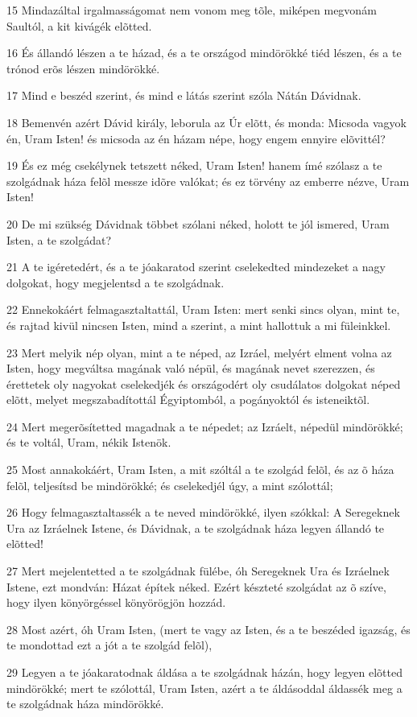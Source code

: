 \par 15 Mindazáltal irgalmasságomat nem vonom meg tõle, miképen megvonám Saultól, a kit kivágék elõtted.
\par 16 És állandó lészen a te házad, és a te országod mindörökké tiéd lészen, és a te trónod erõs lészen mindörökké.
\par 17 Mind e beszéd szerint, és mind e látás szerint szóla Nátán Dávidnak.
\par 18 Bemenvén azért Dávid király, leborula az Úr elõtt, és monda: Micsoda vagyok én, Uram Isten! és micsoda az én házam népe, hogy engem ennyire elõvittél?
\par 19 És ez még csekélynek tetszett néked, Uram Isten! hanem ímé szólasz a te szolgádnak háza felõl  messze idõre valókat; és ez törvény az emberre nézve, Uram Isten!
\par 20 De mi szükség Dávidnak többet szólani néked, holott te jól ismered, Uram Isten, a te szolgádat?
\par 21 A te igéretedért, és a te jóakaratod szerint cselekedted mindezeket a nagy dolgokat, hogy megjelentsd a te szolgádnak.
\par 22 Ennekokáért felmagasztaltattál, Uram Isten: mert senki sincs olyan, mint te, és rajtad kivül nincsen Isten, mind a szerint, a mint hallottuk a mi füleinkkel.
\par 23 Mert melyik nép olyan, mint a te néped, az Izráel, melyért  elment volna az Isten, hogy megváltsa magának való népül, és magának nevet szerezzen, és érettetek oly nagyokat cselekedjék és országodért oly csudálatos dolgokat néped elõtt, melyet megszabadítottál Égyiptomból, a pogányoktól és isteneiktõl.
\par 24 Mert megerõsítetted magadnak a te népedet; az Izráelt, népedül mindörökké; és te voltál, Uram, nékik Istenök.
\par 25 Most annakokáért, Uram Isten, a mit szóltál a te szolgád felõl, és az õ háza felõl, teljesítsd be mindörökké; és cselekedjél úgy, a mint szólottál;
\par 26 Hogy felmagasztaltassék a te neved mindörökké, ilyen szókkal: A Seregeknek Ura az Izráelnek Istene, és Dávidnak, a te szolgádnak háza legyen állandó te elõtted!
\par 27 Mert mejelentetted a te szolgádnak fülébe, óh Seregeknek Ura és Izráelnek  Istene, ezt mondván: Házat építek néked. Ezért készteté szolgádat az õ szíve, hogy ilyen könyörgéssel könyörögjön hozzád.
\par 28 Most azért, óh Uram Isten, (mert te vagy az Isten, és a te beszéded igazság, és te mondottad ezt a jót a te szolgád felõl),
\par 29 Legyen a te jóakaratodnak áldása a te szolgádnak házán, hogy legyen elõtted mindörökké; mert te szólottál, Uram Isten, azért a te áldásoddal áldassék meg a te szolgádnak háza mindörökké.

